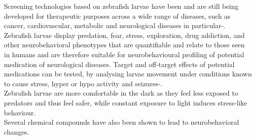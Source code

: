 \documentclass[a4paper,12pt]{article}
\begin{document}
Screening technologies based on zebrafish larvae have been and are still being developed for therapeutic purposes across a wide range of diseases, such as cancer, cardiovascular, metabolic and neurological diseases in particular\cite{ref5}-\cite{ref8}. \\Zebrafish larvae display predation, fear, stress, exploration, drug addiction, and other neurobehavioral phenotypes that are quantifiable and relate to those seen in humans and are therefore suitable for neurobehavioural profiling of potential medication of neurological diseases\cite{ref9}\cite{ref10}. Target and off-target effects of potential medications can be tested, by analysing larvae movement under conditions known to cause stress, hyper or hypo activity and seizures\cite{ref11}-\cite{ref14}.
\\Zebrafish larvae are more comfortable in the dark as they feel less exposed to predators and thus feel safer, while constant exposure to light induces stress-like behaviour\cite{ref15}. \\Several chemical compounds have also been shown to lead to neurobehavioral changes. 
\end{document}
